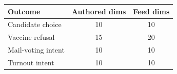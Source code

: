 \begin{tabular}{lcc}
\toprule
Outcome & Authored dims & Feed dims \\
\midrule
Candidate choice & 10 & 10 \\
Vaccine refusal & 15 & 20 \\
Mail-voting intent & 10 & 10 \\
Turnout intent & 10 & 10 \\
\bottomrule
\end{tabular}